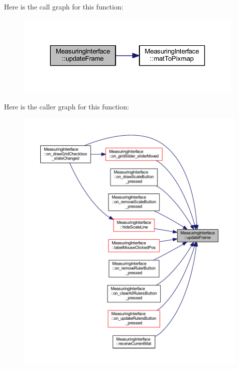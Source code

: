 Here is the call graph for this function\+:
\nopagebreak
\begin{figure}[H]
\begin{center}
\leavevmode
\includegraphics[width=312pt]{class_measuring_interface_ac117ad50a7b325e4aff2651a6a04d1f4_cgraph}
\end{center}
\end{figure}
Here is the caller graph for this function\+:
\nopagebreak
\begin{figure}[H]
\begin{center}
\leavevmode
\includegraphics[width=350pt]{class_measuring_interface_ac117ad50a7b325e4aff2651a6a04d1f4_icgraph}
\end{center}
\end{figure}
\mbox{\label{class_measuring_interface_a049b5fba322e426db13761cf8d66f8a2}} 
